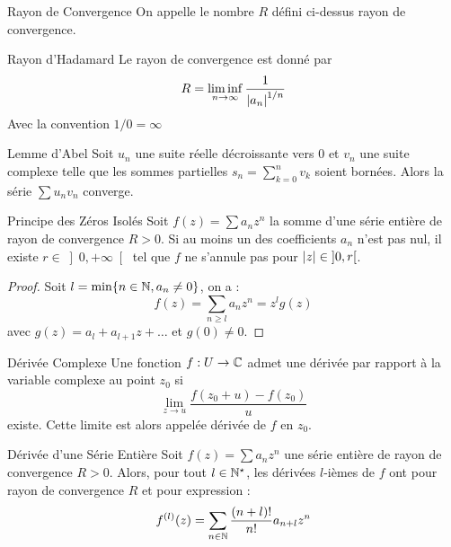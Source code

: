 \documentclass{cours}
\begin{document}
\begin{définition}{Rayon de Convergence}{}
    On appelle le nombre $R$ défini ci-dessus rayon de convergence.
\end{définition}

\begin{propositionfr}{Rayon d'Hadamard}{}
    Le rayon de convergence est donné par 
    \[
        R = \liminf_{n \to \infty}\frac{1}{\left|a_{n}\right|^{1/n}}
    \]
    Avec la convention $1/0 = \infty$
\end{propositionfr}

\begin{lemme}{Lemme d'Abel}{}
    Soit $u_{n}$ une suite réelle décroissante vers $0$ et $v_{n}$ une suite complexe telle que les sommes partielles $s_{n} = \sum_{k = 0}^{n} v_{k}$ soient bornées. Alors la série $\sum u_{n}v_{n}$ converge.
\end{lemme}

\begin{propositionfr}{Principe des Zéros Isolés}{}
    Soit $f(z) = \sum a_{n}z^{n}$ la somme d'une série entière de rayon de convergence $R > 0$. Si au moins un des coefficients $a_{n}$ n'est pas nul, il existe $r \in \left] 0, +\infty\right[$ tel que $f$ ne s'annule pas pour $\left|z\right| \in \left]0, r\right[$.
\end{propositionfr}
\begin{proof}
    Soit $l = \min \{n \in \mathbb{N}, a_{n} \neq 0\}$, on a : 
    \[
        f(z) = \sum_{n \geq l} a_{n}z^{n} = z^{l}g(z)
    \]
    avec $g(z) = a_{l} + a_{l + 1}z + \ldots$ et $g(0) \neq 0$. 
\end{proof}

\begin{définition}{Dérivée Complexe}{}
    Une fonction $f : U \to \mathbb{C}$ admet une dérivée par rapport à la variable complexe au point $z_{0}$ si
    \[
        \lim_{z \to u} \frac{f(z_{0} + u)- f(z_{0})}{u}
    \]
    existe. Cette limite est alors appelée dérivée de $f$ en $z_{0}$.
\end{définition}

\begin{propositionfr}{Dérivée d'une Série Entière}{}
    Soit $f(z) = \sum a_{n}z^{n}$ une série entière de rayon de convergence $R > 0$. Alors, pour tout $l \in \mathbb{N}^{\star}$, les dérivées $l$-ièmes de $f$ ont pour rayon de convergence $R$ et pour expression : 
    \[
        f^{(l)}(z) = \sum_{n \in \mathbb{N}}\frac{(n + l)!}{n!}a_{n + l}z^{n}  
    \]
\end{propositionfr}
\end{document}
